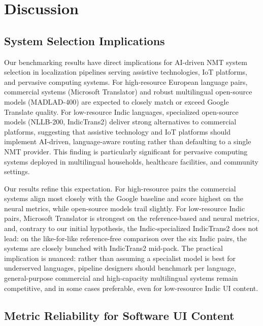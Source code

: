 \documentclass[Afour,sagev,times,doublespace]{sagej}
\begin{document}
\section{Discussion}

\subsection{System Selection Implications}

Our benchmarking results have direct implications for AI-driven NMT system selection in localization pipelines serving assistive technologies, IoT platforms, and pervasive computing systems. For high-resource European language pairs, commercial systems (Microsoft Translator) and robust multilingual open-source models (MADLAD-400) are expected to closely match or exceed Google Translate quality. For low-resource Indic languages, specialized open-source models (NLLB-200, IndicTrans2) deliver strong alternatives to commercial platforms, suggesting that assistive technology and IoT platforms should implement AI-driven, language-aware routing rather than defaulting to a single NMT provider. This finding is particularly significant for pervasive computing systems deployed in multilingual households, healthcare facilities, and community settings.

Our results refine this expectation. For high-resource pairs the commercial systems align most closely with the Google baseline and score highest on the neural metrics, while open-source models trail slightly. For low-resource Indic pairs, Microsoft Translator is strongest on the reference-based and neural metrics, and, contrary to our initial hypothesis, the Indic-specialized IndicTrans2 does not lead: on the like-for-like reference-free comparison over the six Indic pairs, the systems are closely bunched with IndicTrans2 mid-pack. The practical implication is nuanced: rather than assuming a specialist model is best for underserved languages, pipeline designers should benchmark per language, general-purpose commercial and high-capacity multilingual systems remain competitive, and in some cases preferable, even for low-resource Indic UI content.

\subsection{Metric Reliability for Software UI Content}
\end{document}
